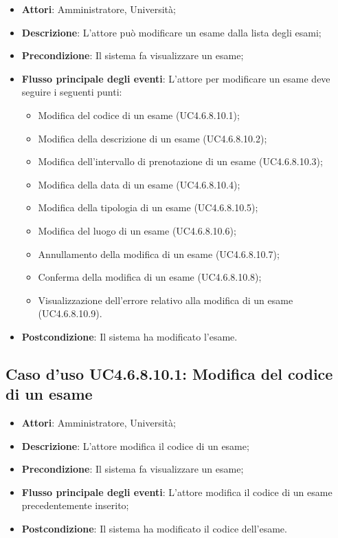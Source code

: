 \begin{itemize}
	\item \textbf{Attori}: Amministratore, Università;
	\item \textbf{Descrizione}: L'attore può modificare un esame dalla lista degli esami;
	
	\item \textbf{Precondizione}: Il sistema fa visualizzare un esame;
	
	\item \textbf{Flusso principale degli eventi}: L'attore per modificare un esame deve seguire i seguenti punti:
	
	\begin{itemize}
		\item Modifica del codice di un esame (UC4.6.8.10.1);
		\item Modifica della descrizione di un esame (UC4.6.8.10.2);
		\item Modifica dell’intervallo di prenotazione di un esame (UC4.6.8.10.3);
		\item Modifica della data di un esame (UC4.6.8.10.4);
		\item Modifica della tipologia di un esame (UC4.6.8.10.5);
		\item Modifica del luogo di un esame (UC4.6.8.10.6);
		\item Annullamento della modifica di un esame (UC4.6.8.10.7);
		\item Conferma della modifica di un esame (UC4.6.8.10.8);
		\item Visualizzazione dell'errore relativo alla modifica di un esame (UC4.6.8.10.9).
	\end{itemize}
	\item \textbf{Postcondizione}: Il sistema ha modificato l'esame.
	
\end{itemize}
\subsection{Caso d'uso \texorpdfstring{UC4.6.8.10.1}{UC4.6.8.10.1}: Modifica del codice di un esame}
\begin{itemize}
	\item \textbf{Attori}: Amministratore, Università;
	\item \textbf{Descrizione}: L'attore modifica il codice di un esame;
	
	\item \textbf{Precondizione}: Il sistema fa visualizzare un esame;
	
	
	\item \textbf{Flusso principale degli eventi}: L'attore modifica il codice di un esame precedentemente inserito;
	
	\item \textbf{Postcondizione}: Il sistema ha modificato il codice dell’esame.
	
\end{itemize}
